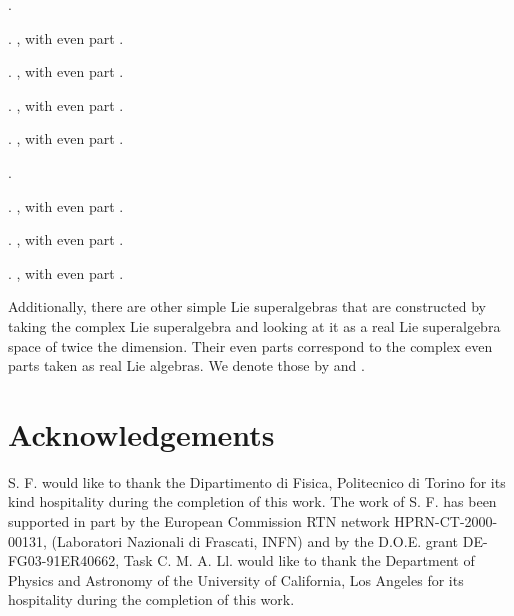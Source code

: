\documentclass[a4paper,12pt]{article}
\begin{document}
.

\medskip

. \coordHE{}, with even part
\coordHE{}.

. \coordHE{}, with even part
\coordHE{}.

. \coordHE{}, with even part
\coordHE{}.

. \coordHE{}, with even part
\coordHE{}.

\bigskip

.

\medskip

. \coordHE{}, with even part
\coordHE{}.

. \coordHE{}, with even part
\coordHE{}.

. \coordHE{}, with even part
\coordHE{}.

\bigskip

Additionally, there are other simple Lie superalgebras that are
constructed by taking the complex Lie superalgebra and looking at
it as a real Lie superalgebra space of twice the dimension. Their
even parts correspond to the complex even parts taken as real Lie
algebras. We denote those by \coordHE{} and
\coordHE{}.








\section*{Acknowledgements}

S. F. would like to thank the Dipartimento di Fisica, Politecnico
di Torino for its kind hospitality during the completion of this
work. The work of S. F. has been supported in part by the European
Commission RTN network HPRN-CT-2000-00131, (Laboratori Nazionali
di Frascati, INFN) and by the D.O.E. grant DE-FG03-91ER40662, Task
C. M. A. Ll. would like to thank the Department of Physics and
Astronomy of the University of California, Los Angeles for its
hospitality during the completion of this work.
\end{document}

